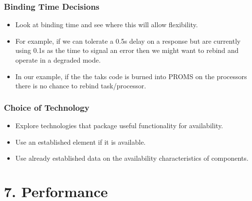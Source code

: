 \documentclass{report}
\begin{document}
\subsection{Binding Time Decisions}
\begin{itemize}
\item{Look at binding time and see where this will allow flexibility.}
\item{For example, if we can tolerate a 0.5s delay on a response but are currently using 0.1s as the time to signal an error then we might want to rebind and operate in a degraded mode.}
\item{In our example, if the the taks code is burned into PROMS on the processors there is no chance to rebind task/processor.}
\end{itemize}
\subsection{Choice of Technology}
\begin{itemize}
\item{Explore technologies that package useful functionality for availability.}
\item{Use an established element if it is available.}
\item{Use already established data on the availability characteristics of components.}
\end{itemize}

\chapter{7. Performance}
\end{document}
